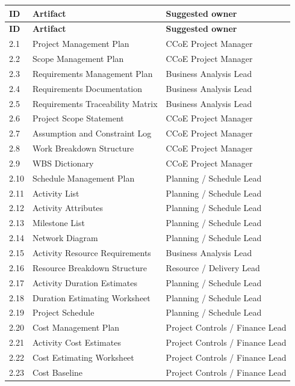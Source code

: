 \documentclass[10pt,letterpaper]{article}
\begin{document}
\begingroup\footnotesize\begin{longtable}{@{}p{.65in}p{2.95in}p{2.35in}@{}}\toprule\textbf{ID} & \textbf{Artifact} & \textbf{Suggested owner}\\\midrule\endfirsthead\toprule\textbf{ID} & \textbf{Artifact} & \textbf{Suggested owner}\\\midrule\endhead
2.1 & Project Management Plan & CCoE Project Manager\\
2.2 & Scope Management Plan & CCoE Project Manager\\
2.3 & Requirements Management Plan & Business Analysis Lead\\
2.4 & Requirements Documentation & Business Analysis Lead\\
2.5 & Requirements Traceability Matrix & Business Analysis Lead\\
2.6 & Project Scope Statement & CCoE Project Manager\\
2.7 & Assumption and Constraint Log & CCoE Project Manager\\
2.8 & Work Breakdown Structure & CCoE Project Manager\\
2.9 & WBS Dictionary & CCoE Project Manager\\
2.10 & Schedule Management Plan & Planning / Schedule Lead\\
2.11 & Activity List & Planning / Schedule Lead\\
2.12 & Activity Attributes & Planning / Schedule Lead\\
2.13 & Milestone List & Planning / Schedule Lead\\
2.14 & Network Diagram & Planning / Schedule Lead\\
2.15 & Activity Resource Requirements & Business Analysis Lead\\
2.16 & Resource Breakdown Structure & Resource / Delivery Lead\\
2.17 & Activity Duration Estimates & Planning / Schedule Lead\\
2.18 & Duration Estimating Worksheet & Planning / Schedule Lead\\
2.19 & Project Schedule & Planning / Schedule Lead\\
2.20 & Cost Management Plan & Project Controls / Finance Lead\\
2.21 & Activity Cost Estimates & Project Controls / Finance Lead\\
2.22 & Cost Estimating Worksheet & Project Controls / Finance Lead\\
2.23 & Cost Baseline & Project Controls / Finance Lead\\

\end{longtable}
\end{document}
